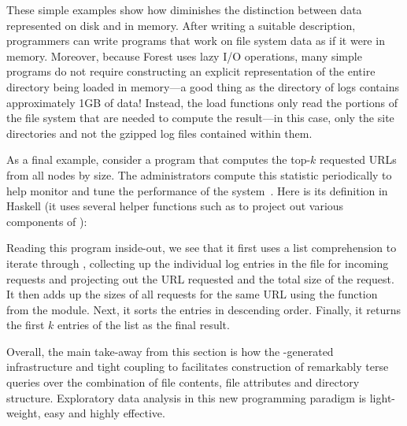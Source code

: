 These simple examples show how \forest{} diminishes the distinction
between data represented on disk and in memory. After writing a
suitable \forest{} description, programmers can write programs that
work on file system data as if it were in memory. Moreover, because
Forest uses lazy I/O operations, many simple programs do not require
constructing an explicit representation of the entire directory being
loaded in memory---a good thing as the directory of \coral{} logs
contains approximately 1GB of data!  Instead, the load functions only
read the portions of the file system that are needed to compute the
result---in this case, only the site directories and not the gzipped
log files contained within them.

As a final example, consider a program that computes the top-$k$
requested URLs from all \coral{} nodes by size. The \coral{}
administrators compute this statistic periodically to help monitor and
tune the performance of the system~\cite{freedman:coral-experience}. 
Here is its definition in Haskell (it uses several helper
functions such as  to project out various components of
):
%
Reading this program inside-out, we see that it first uses a list
comprehension to iterate through , collecting up the
individual log entries in the  file for
incoming requests and projecting out the URL requested and the total
size of the request. It then adds up the sizes of all requests for the
same URL using the  function from the 
module. Next, it sorts the entries in descending order. Finally, it
returns the first $k$ entries of the list as the final result.

Overall, the main take-away from this section is how 
the \forest{}-generated infrastructure and tight coupling
to \haskell{} facilitates construction
of remarkably terse queries over the combination of file contents,
file attributes and directory structure.  Exploratory data analysis
in this new programming paradigm is light-weight, easy and highly effective.
